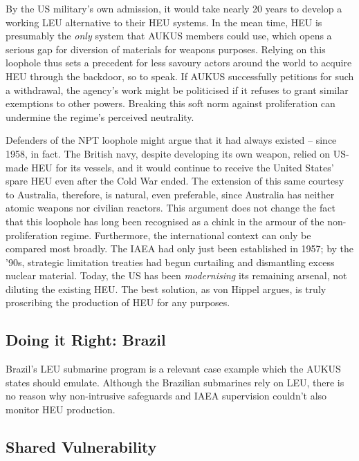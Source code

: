 \documentclass[letterpaper,12pt,twoside]{article} %
\begin{document}
\begin{multicols}{2}
By the US military's own admission, it would take nearly 20 years to develop a working LEU alternative to their HEU systems. In the mean time, HEU is presumably the \textit{only} system that AUKUS members could use, which opens a serious gap for diversion of materials for weapons purposes. Relying on this loophole thus sets a precedent for less savoury actors around the world to acquire HEU through the backdoor, so to speak. If AUKUS successfully petitions for such a withdrawal, the agency's work might be politicised if it refuses to grant similar exemptions to other powers. Breaking this soft norm against proliferation can undermine the regime's perceived neutrality.

Defenders of the NPT loophole might argue that it had always existed -- since 1958, in fact. The British navy, despite developing its own weapon, relied on US-made HEU for its vessels, and it would continue to receive the United States' spare HEU even after the Cold War ended.\autocite[39. Footnote 32.]{hippel2016banning} The extension of this same courtesy to Australia, therefore, is natural, even preferable, since Australia has neither atomic weapons nor civilian reactors. This argument does not change the fact that this loophole has long been recognised as a chink in the armour of the non-proliferation regime. Furthermore, the international context can only be compared most broadly. The IAEA had only just been established in 1957; by the '90s, strategic limitation treaties had begun curtailing and dismantling excess nuclear material. Today, the US has been \textit{modernising} its remaining arsenal, not diluting the existing HEU. The best solution, as von Hippel\autocite{hippel2016banning} argues, is truly proscribing the production of HEU for any purposes.

\subsection{Doing it Right: Brazil}

Brazil's LEU submarine program is a relevant case example which the AUKUS states should emulate. Although the Brazilian submarines rely on LEU, there is no reason why non-intrusive safeguards and IAEA supervision couldn't also monitor HEU production.

\subsection{Shared Vulnerability}


\end{multicols}
\end{document}
